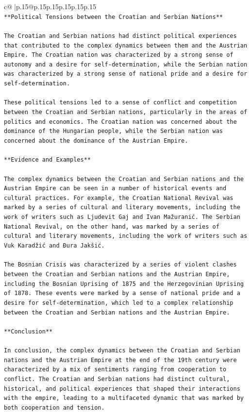 \documentclass{article}
\begin{document}
{\begin{supertabular}{c@{$\;$}|p{.15\linewidth}@{}p{.15\linewidth}p{.15\linewidth}p{.15\linewidth}p{.15\linewidth}p{.15\linewidth}}
{{{\\ 
\texttt{**Political Tensions between the Croatian and Serbian Nations**} \\
\\ 
\texttt{The Croatian and Serbian nations had distinct political experiences that contributed to the complex dynamics between them and the Austrian Empire. The Croatian nation was characterized by a strong sense of autonomy and a desire for self{-}determination, while the Serbian nation was characterized by a strong sense of national pride and a desire for self{-}determination.} \\
\\ 
\texttt{These political tensions led to a sense of conflict and competition between the Croatian and Serbian nations, particularly in the areas of politics and economics. The Croatian nation was concerned about the dominance of the Hungarian people, while the Serbian nation was concerned about the dominance of the Austrian Empire.} \\
\\ 
\texttt{**Evidence and Examples**} \\
\\ 
\texttt{The complex dynamics between the Croatian and Serbian nations and the Austrian Empire can be seen in a number of historical events and cultural practices. For example, the Croatian National Revival was marked by a series of cultural and literary movements, including the work of writers such as Ljudevit Gaj and Ivan Mažuranić. The Serbian National Revival, on the other hand, was marked by a series of cultural and literary movements, including the work of writers such as Vuk Karadžić and Đura Jakšić.} \\
\\ 
\texttt{The Bosnian Crisis was characterized by a series of violent clashes between the Croatian and Serbian nations and the Austrian Empire, including the Bosnian Uprising of 1875 and the Herzegovinian Uprising of 1878. These events were marked by a sense of national pride and a desire for self{-}determination, which led to a complex relationship between the Croatian and Serbian nations and the Austrian Empire.} \\
\\ 
\texttt{**Conclusion**} \\
\\ 
\texttt{In conclusion, the complex dynamics between the Croatian and Serbian nations and the Austrian Empire at the end of the 19th century were characterized by a mix of sentiments ranging from cooperation to conflict. The Croatian and Serbian nations had distinct cultural, historical, and political experiences that shaped their interactions with the empire, leading to a multifaceted dynamic that was marked by both cooperation and tension.} \\
}}}
\end{supertabular}}
\end{document}
